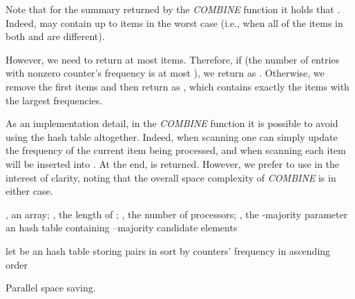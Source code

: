 \documentclass[final,3p,times]{elsarticle}
\begin{document}
Note that for the  summary returned by the \textit{COMBINE} function it holds that . Indeed,   may contain up to  items in the worst case (i.e., when all of the items in both  and  are different). 

However, we need to return at most  items. Therefore, if  (the number of entries with nonzero counter's frequency is at most ), we return  as . Otherwise, we remove the first  items and then return  as , which contains exactly the  items with the largest frequencies.

As an implementation detail, in the \textit{COMBINE} function it is possible to avoid using the  hash table altogether. Indeed, when scanning  one can simply update the frequency of the current item being processed, and when scanning  each item will be inserted into . At the end,  is returned. However, we prefer to use  in the interest of clarity, noting that the overall space complexity of \textit{COMBINE} is  in either case.




\begin{algorithm}
\begin{algorithmic}[1]
\Require , an array; , the length of ; , the number of processors; , the -majority parameter
\Ensure an hash table containing --majority candidate elements
\State 
\State 

\State 
{}
\State let  be an hash table storing  pairs in 
\State sort  by counters' frequency in ascending order
\State 
{}

\If{} 
	\State  
	\State \Return  
\EndIf

\EndProcedure
\caption{Parallel space saving.}
\label{pss}
\end{algorithmic}
\end{algorithm}
\end{document}
